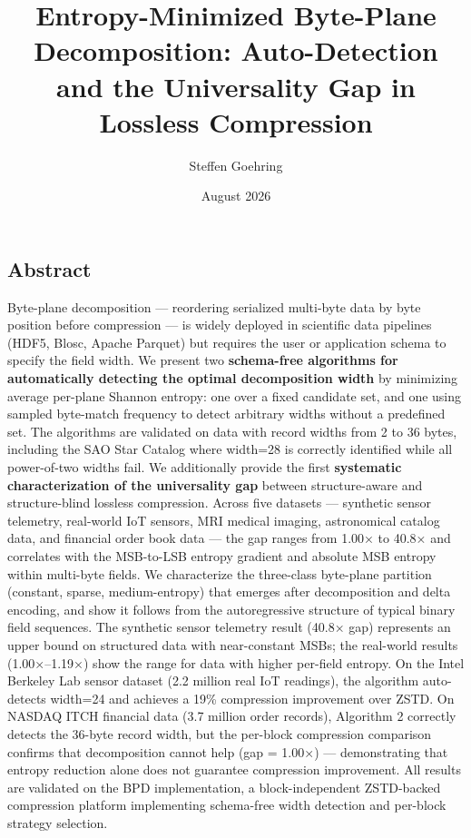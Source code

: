 \documentclass[
  11pt,
  letterpaper,
]{article}
\title{Entropy-Minimized Byte-Plane Decomposition: Auto-Detection and
the Universality Gap in Lossless Compression}
\author{Steffen Goehring}
\date{August 2026}
\makeatletter
\renewcommand{\_}{\bpd@origunderscore\allowbreak}
\makeatother
\begin{document}
\maketitle

\hypertarget{abstract}{%
\subsection{Abstract}\label{abstract}}

Byte-plane decomposition --- reordering serialized multi-byte data by
byte position before compression --- is widely deployed in scientific
data pipelines (HDF5, Blosc, Apache Parquet) but requires the user or
application schema to specify the field width. We present two
\textbf{schema-free algorithms for automatically detecting the optimal
decomposition width} by minimizing average per-plane Shannon entropy:
one over a fixed candidate set, and one using sampled byte-match
frequency to detect arbitrary widths without a predefined set. The
algorithms are validated on data with record widths from 2 to 36 bytes,
including the SAO Star Catalog where width=28 is correctly identified
while all power-of-two widths fail. We additionally provide the first
\textbf{systematic characterization of the universality gap} between
structure-aware and structure-blind lossless compression. Across five
datasets --- synthetic sensor telemetry, real-world IoT sensors, MRI
medical imaging, astronomical catalog data, and financial order book
data --- the gap ranges from 1.00× to 40.8× and correlates with the
MSB-to-LSB entropy gradient and absolute MSB entropy within multi-byte
fields. We characterize the three-class byte-plane partition (constant,
sparse, medium-entropy) that emerges after decomposition and delta
encoding, and show it follows from the autoregressive structure of
typical binary field sequences. The synthetic sensor telemetry result
(40.8× gap) represents an upper bound on structured data with
near-constant MSBs; the real-world results (1.00×--1.19×) show the range
for data with higher per-field entropy. On the Intel Berkeley Lab sensor
dataset (2.2 million real IoT readings), the algorithm auto-detects
width=24 and achieves a 19\% compression improvement over ZSTD. On
NAS\-DAQ ITCH financial data (3.7 million order records), Algorithm 2
correctly detects the 36-byte record width, but the per-block
compression comparison confirms that decomposition cannot help (gap =
1.00×) --- demonstrating that entropy reduction alone does not guarantee
compression improvement. All results are validated on the BPD
implementation, a block-independent ZSTD-backed compression platform
implementing schema-free width detection and per-block strategy
selection.
\end{document}

